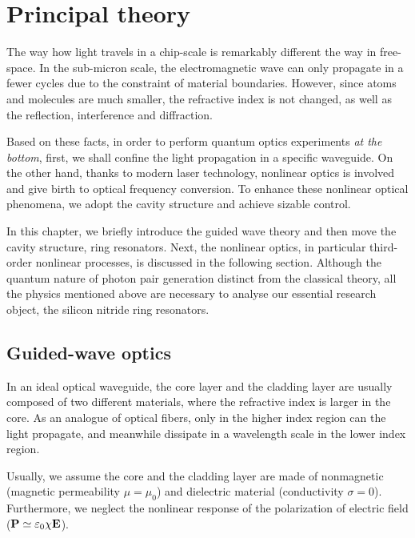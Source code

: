 
\chapter{Principal theory}

The way how light travels in a chip-scale is remarkably different the way in free-space. In the sub-micron scale, the electromagnetic wave can only propagate in a fewer cycles due to the constraint of material boundaries. However, since atoms and molecules are much smaller, the refractive index is not changed, as well as the reflection, interference and diffraction. 

Based on these facts, in order to perform quantum optics experiments \textit{at the bottom}, first, we shall confine the light propagation in a specific waveguide. On the other hand, thanks to modern laser technology, nonlinear optics is involved and give birth to optical frequency conversion. To enhance these nonlinear optical phenomena, we adopt the cavity structure and achieve sizable control.

In this chapter, we briefly introduce the guided wave theory and then move the cavity structure, ring resonators. Next, the nonlinear optics, in particular third-order nonlinear processes, is discussed in the following section. Although the quantum nature of photon pair generation distinct from the classical theory, all the physics mentioned above are necessary to analyse our essential research object, the silicon nitride ring resonators.


\section{Guided-wave optics}\label{sec:guide}

In an ideal optical waveguide, the core layer and the cladding layer are usually composed of two different materials, where the refractive index is larger in the core. As an analogue of optical fibers, only in the higher index region can the light propagate, and meanwhile dissipate in a wavelength scale in the lower index region.

Usually, we assume the core and the cladding layer are made of nonmagnetic (magnetic permeability $\mu = \mu_0$) and dielectric material (conductivity $\sigma = 0$). Furthermore, we neglect the nonlinear response of the polarization of electric field ($\vb{P} \simeq \varepsilon_0 \chi \vb{E}$).

